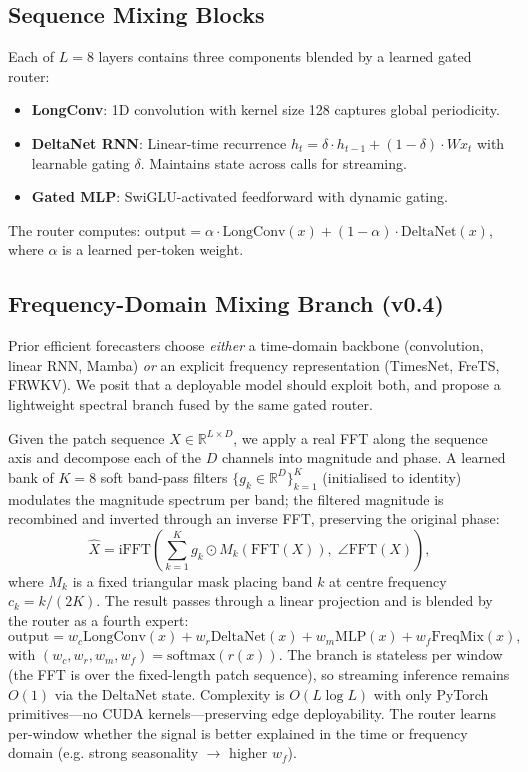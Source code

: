 \documentclass[11pt]{article}
\begin{document}
\subsection{Sequence Mixing Blocks}
Each of $L=8$ layers contains three components blended by a learned gated router:

\begin{itemize}
    \item \textbf{LongConv}: 1D convolution with kernel size 128 captures global periodicity.
    \item \textbf{DeltaNet RNN}: Linear-time recurrence $h_t = \delta \cdot h_{t-1} + (1-\delta) \cdot W x_t$ with learnable gating $\delta$. Maintains state across calls for streaming.
    \item \textbf{Gated MLP}: SwiGLU-activated feedforward with dynamic gating.
\end{itemize}

The router computes: $\text{output} = \alpha \cdot \text{LongConv}(x) + (1-\alpha) \cdot \text{DeltaNet}(x)$, where $\alpha$ is a learned per-token weight.

\subsection{Frequency-Domain Mixing Branch (v0.4)}
\label{sec:freqmix}
Prior efficient forecasters choose \emph{either} a time-domain backbone
(convolution, linear RNN, Mamba) \emph{or} an explicit frequency representation
(TimesNet, FreTS, FRWKV). We posit that a deployable model should exploit both,
and propose a lightweight spectral branch fused by the same gated router.

Given the patch sequence $X \in \mathbb{R}^{L \times D}$, we apply a real FFT
along the sequence axis and decompose each of the $D$ channels into magnitude
and phase. A learned bank of $K=8$ soft band-pass filters
$\{g_k \in \mathbb{R}^D\}_{k=1}^K$ (initialised to identity) modulates the
magnitude spectrum per band; the filtered magnitude is recombined and inverted
through an inverse FFT, preserving the original phase:
\begin{equation}
    \hat{X} = \text{iFFT}\!\left( \sum_{k=1}^{K} g_k \odot M_k(\text{FFT}(X)),\; \angle\!\text{FFT}(X) \right),
\end{equation}
where $M_k$ is a fixed triangular mask placing band $k$ at centre frequency
$c_k = k / (2K)$. The result passes through a linear projection and is blended
by the router as a fourth expert:
\begin{equation}
    \text{output} = w_c \text{LongConv}(x) + w_r \text{DeltaNet}(x) + w_m \text{MLP}(x) + w_f \text{FreqMix}(x),
\end{equation}
with $(w_c, w_r, w_m, w_f) = \text{softmax}(r(x))$. The branch is stateless per
window (the FFT is over the fixed-length patch sequence), so streaming inference
remains $O(1)$ via the DeltaNet state. Complexity is $O(L \log L)$ with only
PyTorch primitives---no CUDA kernels---preserving edge deployability. The router
learns per-window whether the signal is better explained in the time or frequency
domain (e.g. strong seasonality $\rightarrow$ higher $w_f$).
\end{document}
